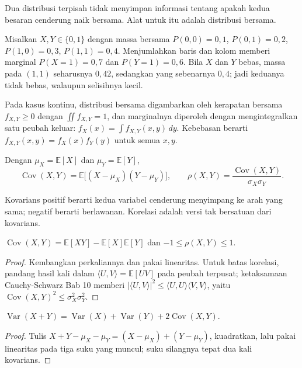 Dua distribusi terpisah tidak menyimpan informasi tentang apakah kedua besaran
cenderung naik bersama. Alat untuk itu adalah distribusi bersama.

\begin{contoh}
Misalkan $X,Y\in\{0,1\}$ dengan massa bersama $P(0,0)=0{,}1$, $P(0,1)=0{,}2$,
$P(1,0)=0{,}3$, $P(1,1)=0{,}4$. Menjumlahkan baris dan kolom memberi marginal
$P(X=1)=0{,}7$ dan $P(Y=1)=0{,}6$. Bila $X$ dan $Y$ bebas, massa pada $(1,1)$
seharusnya $0{,}42$, sedangkan yang sebenarnya $0{,}4$; jadi keduanya tidak bebas,
walaupun selisihnya kecil.
\end{contoh}

Pada kasus kontinu, distribusi bersama digambarkan oleh kerapatan bersama
$f_{X,Y}\ge0$ dengan $\iint f_{X,Y}=1$, dan marginalnya diperoleh dengan
mengintegralkan satu peubah keluar: $f_X(x)=\int f_{X,Y}(x,y)\,dy$. Kebebasan berarti
$f_{X,Y}(x,y)=f_X(x)f_Y(y)$ untuk semua $x,y$.

\begin{definisi}
Dengan $\mu_X=\mathbb{E}[X]$ dan $\mu_Y=\mathbb{E}[Y]$,
\[
\operatorname{Cov}(X,Y)=\mathbb{E}\bigl[(X-\mu_X)(Y-\mu_Y)\bigr],
\qquad
\rho(X,Y)=\frac{\operatorname{Cov}(X,Y)}{\sigma_X\sigma_Y}.
\]
\end{definisi}

Kovarians positif berarti kedua variabel cenderung menyimpang ke arah yang sama;
negatif berarti berlawanan. Korelasi adalah versi tak bersatuan dari kovarians.

\begin{proposisi}
$\operatorname{Cov}(X,Y)=\mathbb{E}[XY]-\mathbb{E}[X]\mathbb{E}[Y]$ dan
$-1\le\rho(X,Y)\le1$.
\end{proposisi}

\begin{proof}
Kembangkan perkaliannya dan pakai linearitas. Untuk batas korelasi, pandang hasil kali
dalam $\langle U,V\rangle=\mathbb{E}[UV]$ pada peubah terpusat; ketaksamaan
Cauchy-Schwarz Bab 10 memberi
$|\langle U,V\rangle|^2\le\langle U,U\rangle\langle V,V\rangle$, yaitu
$\operatorname{Cov}(X,Y)^2\le\sigma_X^2\sigma_Y^2$.
\end{proof}

\begin{teorema}
$\operatorname{Var}(X+Y)=\operatorname{Var}(X)+\operatorname{Var}(Y)
+2\operatorname{Cov}(X,Y)$.
\end{teorema}

\begin{proof}
Tulis $X+Y-\mu_X-\mu_Y=(X-\mu_X)+(Y-\mu_Y)$, kuadratkan, lalu pakai linearitas pada
tiga suku yang muncul; suku silangnya tepat dua kali kovarians.
\end{proof}

